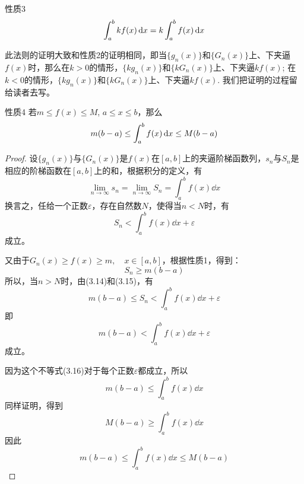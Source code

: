 \begin{blk}{性质3}
\[\displaystyle\int^b_a kf(x)\,{\rm d} x =k\displaystyle\int^b_a f(x)\,{\rm d} x \]
\end{blk}

此法则的证明大致和性质2的证明相同，即当$\{g_n(x)\}$和$\{G_n(x)\}$上、下夹逼$f(x)$时，那么在$k>0$的情形，$\{kg_n(x)\}$和$\{kG_n(x)\}$上、下夹逼$kf(x)$; 在$k<0$的情形，$\{kg_n(x)\}$和$\{kG_n(x)\}$上、下夹逼$kf(x)$. 我们把证明的过程留给读者去写。

\begin{blk}{性质4}
    若$m\le f(x)\le M$, $a\le x\le b$，那么
    \[m(b-a)\le \displaystyle\int^b_a f(x)\,{\rm d} x \le M(b-a) \]
    \end{blk}

\begin{proof}
    设$\{g_n(x)\}$与$\{G_n(x)\}$是$f(x)$在$[a,b]$上的夹逼阶梯函数列，$s_n$与$S_n$是相应的阶梯函数在$[a,b]$上的和，根据积分的定义，有
\[\lim_{n\to\infty}s_n=\lim_{n\to\infty}S_n=\int^b_a f(x)\dd x\]
换言之，任给一个正数$\varepsilon$，存在自然数$N$，使得当$n<N$时，有
\begin{equation}
    S_n<\int^b_a f(x)\dd x+\varepsilon
\end{equation}
成立。

又由于$G_n(x)\ge f(x)\ge m,\quad x\in[a,b]$，根据性质1，得到：
\begin{equation}
    S_n\ge m(b-a)
\end{equation}
所以，当$n>N$时，由(3.14)和(3.15)，有
\[m(b-a)\le S_n<\int^b_a f(x)\dd x+\varepsilon\]
即
\begin{equation}
    m(b-a)<\int^b_a f(x)\dd x+\varepsilon
\end{equation}
成立。

因为这个不等式(3.16)对于每个正数$\varepsilon$都成立，所以
\[m(b-a)\le \int^b_a f(x)\dd x\]
同样证明，得到
\[M(b-a)\ge \int^b_a f(x)\dd x\]
因此
\[m(b-a)\le \int^b_a f(x)\dd x\le M(b-a)\]
\end{proof}

\begin{figure}[htp]
    \centering
{}
    \caption{}
\end{figure}

